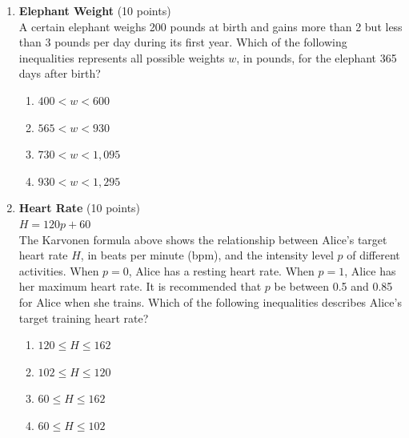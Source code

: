 \begin{enumerate}
  \newpage

  \item \textbf{Elephant Weight} (10 points)\\
  A certain elephant weighs 200 pounds at birth and gains more than 2 but less than 3 pounds per day during its first year. Which of the following inequalities represents all possible weights $w$, in pounds, for the elephant 365 days after birth?\\
  \begin{enumerate}[label=(\Alph*)]
    \item $400<w<600$
    \item $565<w<930$
    \item $730<w<1,095$
    \item $930<w<1,295$
  \end{enumerate}
  \begin{subanswer}
  \end{subanswer}

  \item \textbf{Heart Rate} (10 points)\\
  $H=120p+60$\\
  The Karvonen formula above shows the relationship between Alice's target heart rate $H$, in beats per minute (bpm), and the intensity level $p$ of different activities. When $p=0$, Alice has a resting heart rate. When $p=1$, Alice has her maximum heart rate. It is recommended that $p$ be between 0.5 and 0.85 for Alice when she trains. Which of the following inequalities describes Alice's target training heart rate?\\
  \begin{enumerate}[label=(\Alph*)]
    \item $120 \leq H \leq 162$
    \item $102 \leq H \leq 120$
    \item $60 \leq H \leq 162$
    \item $60 \leq H \leq 102$
  \end{enumerate}
  \begin{subanswer}
  \end{subanswer}

  \newpage


\end{enumerate}

